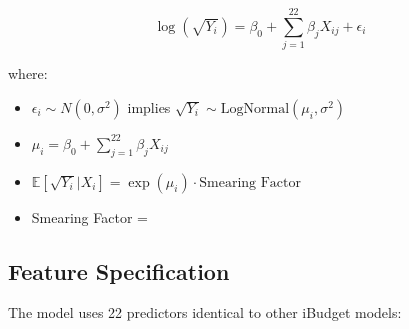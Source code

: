\begin{equation}
\log(\sqrt{Y_i}) = \beta_0 + \sum_{j=1}^{22} \beta_j X_{ij} + \epsilon_i
\end{equation}

where:
\begin{itemize}
    \item $\epsilon_i \sim N(0, \sigma^2)$ implies $\sqrt{Y_i} \sim \text{LogNormal}(\mu_i, \sigma^2)$
    \item $\mu_i = \beta_0 + \sum_{j=1}^{22} \beta_j X_{ij}$
    \item $\mathbb{E}[\sqrt{Y_i} | X_i] = \exp(\mu_i) \cdot \text{Smearing Factor}$
    \item Smearing Factor = \ModelSixSmearingFactor{}
\end{itemize}

\subsection{Feature Specification}

The model uses 22 predictors identical to other iBudget models:

